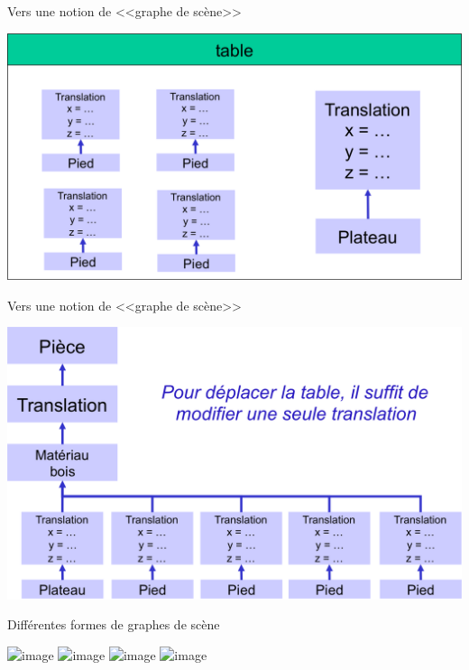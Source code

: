 \begin{frame}{Vers une notion de <<graphe de scène>>}
\begin{center}
\includegraphics[height=.6\textheight]{figs/table3.png}
\end{center}
\end{frame}

\begin{frame}{Vers une notion de <<graphe de scène>>}
\begin{center}
\includegraphics[height=.6\textheight]{figs/table4.png}
\end{center}
\end{frame}

\begin{frame}{Différentes formes de graphes de scène}
\begin{center}
\includegraphics<1>[height=.8\textheight]{figs/sg1.png}
\includegraphics<2>[height=.8\textheight]{figs/sg2.png}
\includegraphics<3>[height=.5\textheight]{figs/sg3.png}
\includegraphics<4>[height=.6\textheight]{figs/sg4.png}
\end{center}
\end{frame}


